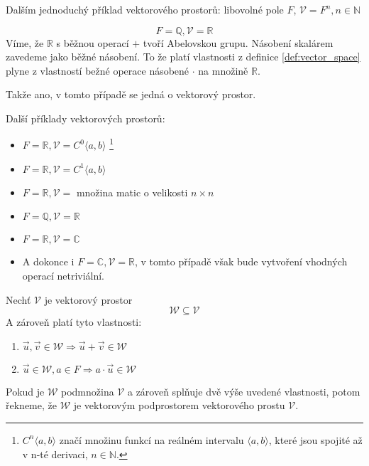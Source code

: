 Dalším jednoduchý příklad vektorového prostorů:
libovolné pole $F$, $\mathcal{V} = F^n, n \in \mathbb{N}$

\begin{example}
    $$F = \mathbb{Q}, \mathcal{V} = \mathbb{R}$$
    Víme, že $\mathbb{R}$ s běžnou operací $+$ tvoří Abelovskou grupu.
    Násobení skalárem zavedeme jako běžné násobení.
    To že platí vlastnosti z definice \ref{def:vector_space} plyne z vlastností
    bežné operace násobené $\cdot$ na množině $\mathbb{R}$.

    Takže ano, v tomto případě se jedná o vektorový prostor.
\end{example}

Další příklady vektorových prostorů:
\begin{itemize}
    \item $F = \mathbb{R}, \mathcal{V} = C^0\langle a, b \rangle$
        \footnote{$C^n\langle a,b \rangle$ značí množinu funkcí na reálném intervalu
        $\langle a,b \rangle$, které jsou spojité až v n-té derivaci, $n \in \mathbb{N}$.}
    \item $F = \mathbb{R}, \mathcal{V} = C^1\langle a, b \rangle$
    \item $F = \mathbb{R}, \mathcal{V}=$ množina matic o velikosti $n \times n$
    \item $F = \mathbb{Q}, \mathcal{V} = \mathbb{R}$
    \item $F = \mathbb{R}, \mathcal{V} = \mathbb{C}$
    \item A dokonce i $F = \mathbb{C}, \mathcal{V} = \mathbb{R}$, v tomto případě však bude
        vytvoření vhodných operací netriviální.
\end{itemize}

\begin{definition}
    Nechť $\mathcal{V}$ je vektorový prostor
    $$\mathcal{W} \subseteq \mathcal{V}$$
    A zároveň platí tyto vlastnosti:
    \begin{enumerate}
        \item $\vec{u}, \vec{v} \in \mathcal{W} \Rightarrow \vec{u} + \vec{v} \in \mathcal{W}$
        \item $\vec{u} \in \mathcal{W}, a \in F \Rightarrow  a \cdot \vec{u} \in \mathcal{W}$
    \end{enumerate}

    Pokud je $\mathcal{W}$ podmnožina $\mathcal{V}$ a zároveň splňuje dvě výše uvedené vlastnosti,
    potom řekneme, že $\mathcal{W}$ je vektorovým podprostorem vektorového prostu $\mathcal{V}$.
\end{definition}

